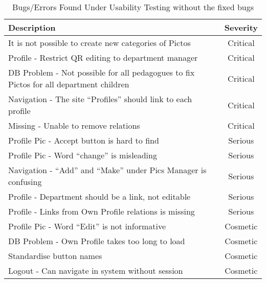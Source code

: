 \begin{table}[!h]
        \centering
                \begin{tabularx}{\linewidth}{| X | c |}
                        \hline
                        Description & Severity\\\hline\hline
                        It is not possible to create new categories of Pictos & Critical \\\hline
                        Profile - Restrict QR editing to department manager & Critical \\\hline 
                        DB Problem - Not possible for all pedagogues to fix Pictos for all department children & Critical \\\hline
                        Navigation - The site ``Profiles'' should link to each profile & Critical \\\hline
                        Missing - Unable to remove relations & Critical \\\hline
                        Profile Pic - Accept button is hard to find & Serious \\\hline
                        Profile Pic - Word ``change'' is misleading & Serious \\\hline
                        Navigation - ``Add'' and ``Make'' under Pics Manager is confusing & Serious \\\hline
                        Profile - Department should be a link, not editable & Serious \\\hline
                        Profile - Links from Own Profile relations is missing & Serious \\\hline
                        Profile Pic - Word ``Edit'' is not informative & Cosmetic \\\hline
                        DB Problem - Own Profile takes too long to load & Cosmetic   \\\hline
                        Standardise button names & Cosmetic \\\hline
                        Logout - Can navigate in system without session & Cosmetic \\\hline
        \end{tabularx}
        \caption{Bugs/Errors Found Under Usability Testing without the fixed bugs}
        \label{tab:Bugs/ErrorsMinusTheDone}
\end{table}

